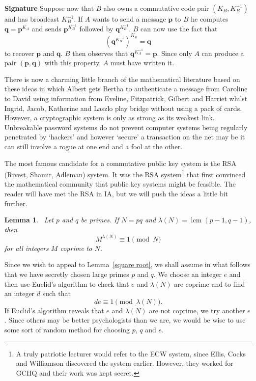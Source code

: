 \documentclass[12pt,a4paper]{article}
\theoremstyle{plain}
\newtheorem{lemma}[theorem]{Lemma}
\theoremstyle{definition}
\newcommand{\lcm}{\operatorname{lcm}}
\begin{document}
    \vspace{1\baselineskip}

    \noindent
    {\bf Signature} Suppose now that $B$ also
    owns a commutative
    code pair $(K_{B},K_{B}^{-1})$ and has broadcast
    $K_{B}^{-1}$. If $A$ wants to send a message
    ${\mathbf p}$ to $B$ he computes
    ${\mathbf q}={\mathbf p}^{K_{A}}$ and
    sends ${\mathbf p}^{K_{B}^{-1}}$
    followed by ${\mathbf q}^{K_{B}^{-1}}$.
    $B$ can now use the fact that
    \[({\mathbf q}^{K_{B}^{-1}})^{K_{B}}=\mathbf{q}\]
    to recover ${\mathbf p}$ and ${\mathbf q}$.
    $B$ then observes that ${\mathbf q}^{K_{A}^{-1}}={\mathbf p}$.
    Since only $A$ can produce a pair $({\mathbf p},{\mathbf q})$
    with this property, $A$ must have written it.

    \vspace{1\baselineskip}

    There is now a charming little branch of the mathematical
    literature based on these ideas
    in which Albert gets Bertha to authenticate
    a message from Caroline to David using information
    from Eveline, Fitzpatrick, Gilbert and Harriet whilst
    Ingrid, Jacob, Katherine and Laszlo play bridge without
    using a pack of cards. However, a cryptographic
    system is only as strong as its weakest link.
    Unbreakable password systems do not prevent
    computer systems being regularly penetrated by
    `hackers' and however `secure' a transaction
    on the net may be it can still involve a rogue at
    one end and a fool at the other.

    The most famous candidate for a commutative
    public key system is the RSA (Rivest, Shamir, Adleman)
    system. It was the RSA system\footnote{A truly
    patriotic lecturer would refer to the ECW system,
    since Ellis, Cocks and Williamson discovered
    the system earlier. However, they worked for GCHQ
    and their work was kept secret.}
    that first convinced the
    mathematical community that public key systems
    might be feasible. The reader will have met
    the RSA in IA, but
    we will push the ideas a little bit further.


    \begin{lemma}
        ~\label{lambda}
        Let $p$ and $q$ be primes. If $N=pq$
        and $\lambda(N)=\lcm(p-1,q-1)$, then
        \[M^{\lambda(N)}\equiv 1\pmod{N}\]
        for all integers $M$ coprime to $N$.
    \end{lemma}

    Since we wish to appeal to Lemma~\ref{square root},
    we shall assume in what follows that
    we have secretly chosen large primes $p$ and $q$.
    We choose
    an integer $e$ and then use Euclid's algorithm
    to check that $e$ and $\lambda(N)$ are coprime
    and to find an integer $d$ such that
    \[de\equiv 1\pmod{\lambda(N)}.\]
    If Euclid's algorithm reveals that
    $e$ and $\lambda(N)$ are not coprime, we try another $e$.
    Since others may be better psychologists than we are,
    we would be wise to use some sort of random method
    for choosing $p$, $q$ and $e$.
\end{document}

